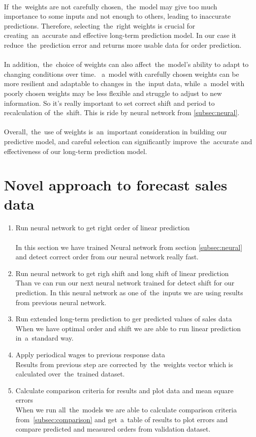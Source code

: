     \\
    If~the~weights are not carefully chosen,~the~model may give too much importance to some inputs and not enough to others,
    leading to inaccurate predictions. Therefore, selecting~the~right weights is crucial for creating~an~accurate and
    effective long-term prediction model. In our case it reduce~the~prediction error and returns more usable
    data for order prediction.\\
    \\
    In addition,~the~choice of weights can also affect~the~model's ability to adapt to changing conditions over time.
   ~a~model with carefully chosen weights can be more resilient and adaptable to changes in~the~input data,
    while~a~model with poorly chosen weights may be less flexible and struggle to adjust to new information.
    So it's really important to set correct shift and period to recalculation of~the~shift.
    This is ride by neural network from \ref{subsec:neural}.\\
    \\
    Overall,~the~use of weights is~an~important consideration in building our predictive model, and careful selection
    can significantly improve~the~accurate and effectiveness of our long-term prediction model.
    \section{Novel approach to forecast sales data}\label{subsec:combining_models}
    \begin{enumerate}
        \item Run neural network to get right order of linear prediction \\
        \\
        In this section we have trained Neural network from section \ref{subsec:neural} and detect correct order from
        our neural network really fast.
        \item Run neural network to get righ shift and long shift of linear prediction\\
        Than ve can run our next neural network trained for detect shift for our prediction. In this neural network as
        one of~the~inputs we are using results from previous neural network.
        \item Run extended long-term prediction to ger predicted values of sales data\\
        When we have optimal order and shift we are able to run linear prediction in~a~standard way.
        \item Apply periodical wages to previous response data\\
        Results from previous step are corrected by~the~weights vector which is calculated over~the~trained dataset.
        \item Calculate comparison criteria for results and plot data and mean square errors\\
        When we run all~the~models we are able to calculate comparison criteria from~\ref{subsec:comparison} and
        get~a~table of results to plot errors and compare predicted and measured orders from validation dataset.
    \end{enumerate}
